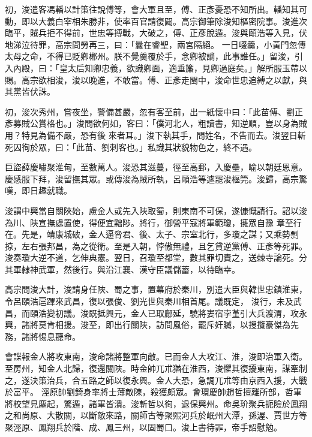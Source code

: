 \begin{pinyinscope}
 初，浚遣客馮轓以計策往說傅等，會大軍且至，傅、正彥憂恐不知所出。轓知其可動，即以大義白宰相朱勝非，使率百官請復闢。高宗御筆除浚知樞密院事。浚進次臨平，賊兵拒不得前，世忠等搏戰，大破之，傅、正彥脫遁。浚與頤浩等入見，伏地涕泣待罪，高宗問勞再三，曰：「曩在睿聖，兩宮隔絕。
 一日啜羹，小黃門忽傳太母之命，不得已貶卿郴州。朕不覺羹覆於手，念卿被謫，此事誰任。」留浚，引入內殿，曰：「皇太后知卿忠義，欲識卿面，適垂簾，見卿過庭矣。」解所服玉帶以賜。高宗欲相浚，浚以晚進，不敢當。傅、正彥走閩中，浚命世忠追縛之以獻，與其黨皆伏誅。



 初，浚次秀州，嘗夜坐，警備甚嚴，忽有客至前，出一紙懷中曰：「此苗傅、劉正彥募賊公賞格也。」浚問欲何如，客曰：「僕河北人，粗讀書，知逆順，豈以身為賊用？特見為備不嚴，恐有後
 來者耳。」浚下執其手，問姓名，不告而去。浚翌日斬死囚徇於眾，曰：「此苗、劉刺客也。」私識其狀貌物色之，終不遇。



 巨盜薛慶嘯聚淮甸，至數萬人。浚恐其滋蔓，徑至高郵，入慶壘，喻以朝廷恩意。慶感服下拜，浚留撫其眾。或傳浚為賊所執，呂頤浩等遽罷浚樞筦。浚歸，高宗驚嘆，即日趣就職。



 浚謂中興當自關陜始，慮金人或先入陜取蜀，則東南不可保，遂慷慨請行。詔以浚為川、陜宣撫處置使，得便宜黜陟。將行，御營平寇將軍範瓊，擁眾自豫
 章至行在。先是，靖康城破，金人逼脅君、後、太子、宗室北行，多瓊之謀；又乘勢剽掠，左右張邦昌，為之從衛。至是入朝，悖傲無禮，且乞貸逆黨傅、正彥等死罪。浚奏瓊大逆不道，乞伸典憲。翌日，召瓊至都堂，數其罪切責之，送棘寺論死。分其軍隸神武軍，然後行。與沿江襄、漢守臣議儲蓄，以待臨幸。



 高宗問浚大計，浚請身任陜、蜀之事，置幕府於秦川，別遣大臣與韓世忠鎮淮東，令呂頤浩扈蹕來武昌，復以張俊、劉光世與秦川相首尾。議既定，
 浚行，未及武昌，而頤浩變初議。浚既抵興元，金人已取鄜延，驍將婁宿孛堇引大兵渡渭，攻永興，諸將莫肯相援。浚至，即出行關陜，訪問風俗，罷斥奸贓，以搜攬豪傑為先務，諸將惕息聽命。



 會諜報金人將攻東南，浚命諸將整軍向敵。已而金人大攻江、淮，浚即治軍入衛。至房州，知金人北歸，復還關陜。時金帥兀朮猶在淮西，浚懼其復擾東南，謀牽制之，遂決策治兵，合五路之師以復永興。金人大恐，急調兀朮等由京西入援，大戰於富平。
 涇原帥劉錡身率將士薄敵陳，殺獲頗眾。會環慶帥趙哲擅離所部，哲軍將校望見塵起，驚遁，諸軍皆潰。浚斬哲以徇，退保興州。命吳玠聚兵扼險於鳳翔之和尚原、大散關，以斷敵來路，關師古等聚熙河兵於岷州大潭，孫渥、賈世方等聚涇原、鳳翔兵於階、成、鳳三州，以固蜀口。浚上書待罪，帝手詔慰勉。




\end{pinyinscope}
